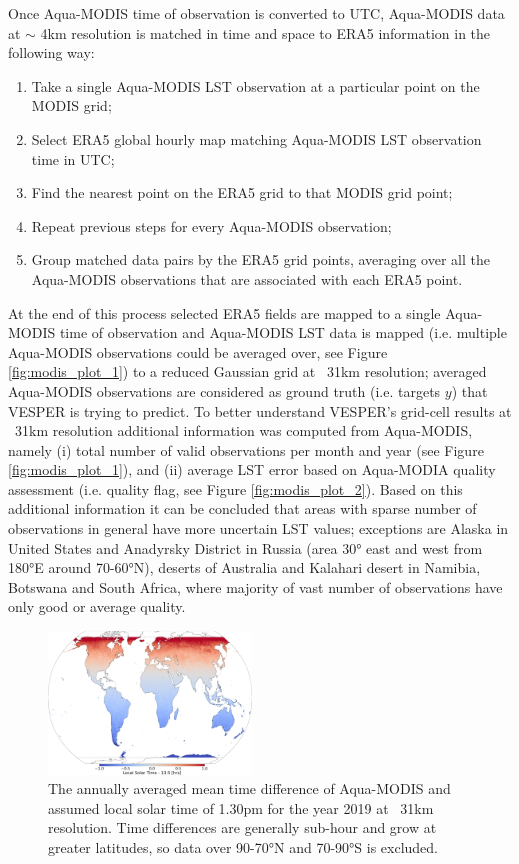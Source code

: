 \documentclass[hess, twostagejnl]{copernicus}
\begin{document}
\noindent Once Aqua-MODIS time of observation is converted to UTC, Aqua-MODIS data at $\sim$ 4km resolution is matched in time and space to ERA5 information in the following way:
\begin{enumerate}
	\item Take a single Aqua-MODIS LST observation at a particular point on the MODIS grid;
	\item Select ERA5 global hourly map matching Aqua-MODIS LST observation time in UTC;
	\item Find the nearest point on the ERA5 grid to that MODIS grid point;
	\item Repeat previous steps for every Aqua-MODIS observation;
	\item Group matched data pairs by the ERA5 grid points, averaging over all the Aqua-MODIS observations that are associated with each ERA5 point.
\end{enumerate}
At the end of this process selected ERA5 fields are mapped to a single Aqua-MODIS time of observation and Aqua-MODIS LST data is mapped (i.e. multiple Aqua-MODIS observations could be averaged over, see Figure \ref{fig:modis_plot_1}) to a reduced Gaussian grid at ~31km resolution; averaged Aqua-MODIS observations are considered as ground truth (i.e. targets $y$) that VESPER is trying to predict. To better understand VESPER’s grid-cell results at ~31km resolution additional information was computed from Aqua-MODIS, namely (i) total number of valid observations per month and year (see Figure \ref{fig:modis_plot_1}), and (ii) average LST error based on Aqua-MODIA quality assessment (i.e. quality flag, see Figure \ref{fig:modis_plot_2}). Based on this additional information it can be concluded that areas with sparse number of observations in general have more uncertain LST values; exceptions are Alaska in United States and Anadyrsky District in Russia (area 30° east and west from 180°E around 70-60°N), deserts of Australia and Kalahari desert in Namibia, Botswana and South Africa, where majority of vast number of observations have only good or average quality. \newline 

\begin{figure}
	\includegraphics[width=0.48\textwidth]{MODIS_local_solar_time_diff}
	\caption{The annually averaged mean time difference of Aqua-MODIS and assumed local solar time of 1.30pm for the year 2019 at ~31km resolution. Time differences are generally sub-hour and grow at greater latitudes, so data over 90-70°N and 70-90°S is excluded. } 
	\label{fig:MODIS_time_error}
\end{figure}
\end{document}
